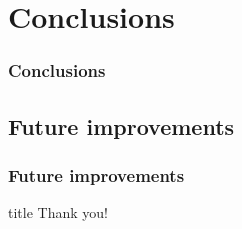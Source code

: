 \documentclass[svgnames,smaller,table]{beamer}
\begin{document}
\section{Conclusions}
\begin{frame}
  \frametitle{Conclusions}
\end{frame}

\subsection{Future improvements}
\begin{frame}
  \frametitle{Future improvements}
\end{frame}

\begin{frame}
 \vfill
  \begin{beamercolorbox}[center]{title}
     \Huge{Thank you!}
  \end{beamercolorbox}
  \vfill

\end{frame}

%        
%        


\end{document}
